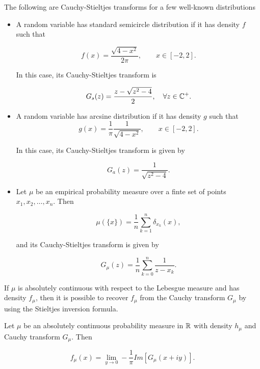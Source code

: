     The following are Cauchy-Stieltjes transforms for a few well-known distributions

    \begin{example}
        \begin{itemize}
            \item A random variable has standard semicircle distribution if it has density $f$ such that
            
            \[ f(x) = \frac{\sqrt{4-x^2}}{2\pi}, \qquad x \in [-2,2]. \]

            In this case, its Cauchy-Stieltjes transform is

            \[G_s(z) = \frac{z - \sqrt{z^2-4}}{2}, \quad \forall z \in \mathbb C^+.\]
            
            \item A random variable has arcsine distribution if it has density $g$ such that
            \[ g(x) = \frac1\pi \frac{1}{\sqrt{4-x^2}}, \qquad x \in [-2,2]. \]

            In this case, its Cauchy-Stieltjes transform is given by

            \[ G_a(z) = \frac{1}{\sqrt{z^2-4}}. \]

            \item Let $\mu$ be an empirical probability measure over a finte set of points $x_1,x_2, \dots, x_n$. Then 
            
            \[ \mu(\{x\}) = \frac1n \sum_{k=1}^n \delta_{x_k}(x), \]

            \noindent and its Cauchy-Stieltjes transform is given by

            \[ G_\mu(z) = \frac1n \sum_{k=0}^n \frac{1}{z - x_k}. \]
        \end{itemize}
    \end{example}

    If $\mu$ is absolutely continuous with respect to the Lebesgue measure and has density $f_\mu$, then it is possible to recover $f_\mu$ from the Cauchy transform $G_\mu$ by using the Stieltjes inversion formula.

    \begin{theorem}
        Let $\mu$ be an absolutely continuous probability measure in $\mathbb R$ with density $h_\mu$ and Cauchy transform $G_\mu$. Then

        \begin{equation*}
            f_\mu(x) = \lim_{y \to 0} - \frac1\pi Im[G_\mu(x + iy)].
        \end{equation*}
    \end{theorem}

